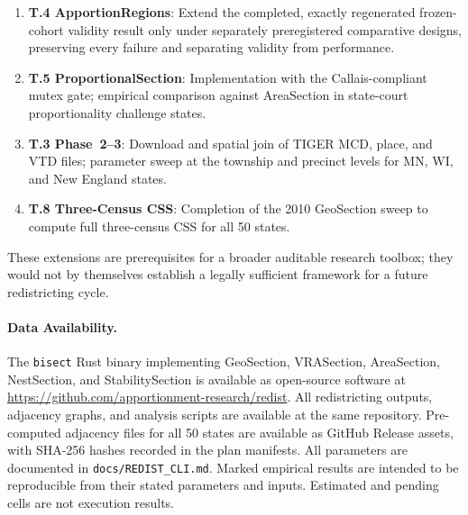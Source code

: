 \begin{enumerate}
  \item \textbf{T.4 ApportionRegions}: Extend the completed, exactly regenerated
    frozen-cohort validity result only under separately preregistered comparative
    designs, preserving every failure and separating validity from performance.
  \item \textbf{T.5 ProportionalSection}: Implementation with the
    Callais-compliant mutex gate; empirical comparison against AreaSection
    in state-court proportionality challenge states.
  \item \textbf{T.3 Phase~2--3}: Download and spatial join of TIGER MCD, place,
    and VTD files; parameter sweep at the township and precinct levels for
    MN, WI, and New England states.
  \item \textbf{T.8 Three-Census CSS}: Completion of the 2010 GeoSection sweep
    to compute full three-census CSS for all 50 states.
\end{enumerate}

These extensions are prerequisites for a broader auditable research toolbox;
they would not by themselves establish a legally sufficient framework for a
future redistricting cycle.

\paragraph{Data Availability.}
The \texttt{bisect} Rust binary implementing GeoSection, VRASection,
AreaSection, NestSection, and StabilitySection is available as open-source
software at \url{https://github.com/apportionment-research/redist}.
All redistricting outputs, adjacency graphs, and analysis scripts are available
at the same repository.
Pre-computed adjacency files for all 50 states are available as GitHub Release assets,
with SHA-256 hashes recorded in the plan manifests.
All parameters are documented in \texttt{docs/REDIST\_CLI.md}.
Marked empirical results are intended to be reproducible from their stated
parameters and inputs. Estimated and pending cells are not execution results.
